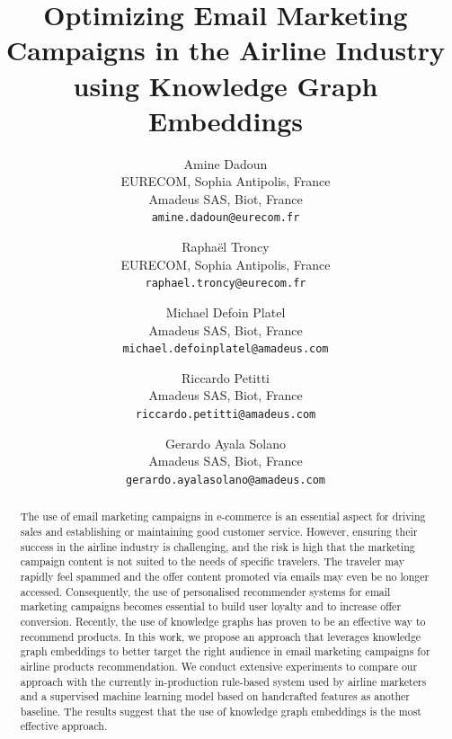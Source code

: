 \documentclass[11pt,dvipdfm]{article}
\begin{document}
\title{Optimizing Email Marketing Campaigns in the Airline Industry \\ using Knowledge Graph Embeddings}

\author{
  Amine Dadoun\\
  EURECOM, Sophia Antipolis, France\\
  Amadeus SAS, Biot, France\\
  \texttt{amine.dadoun@eurecom.fr}
  \and
  Rapha{\"{e}}l Troncy\\
  EURECOM, Sophia Antipolis, France\\
  \texttt{raphael.troncy@eurecom.fr}
  \and
  Michael Defoin Platel\\
  Amadeus SAS, Biot, France\\
  \texttt{michael.defoinplatel@amadeus.com}
  \and
  Riccardo Petitti\\
  Amadeus SAS, Biot, France\\
  \texttt{riccardo.petitti@amadeus.com}
  \and
  Gerardo Ayala Solano\\
  Amadeus SAS, Biot, France\\
  \texttt{gerardo.ayalasolano@amadeus.com}
}

\maketitle

\begin{abstract}
The use of email marketing campaigns in e-commerce is an essential aspect for driving sales and establishing or maintaining good customer service. However, ensuring their success in the airline industry is challenging, and the risk is high that the marketing campaign content is not suited to the needs of specific travelers. The traveler may rapidly feel spammed and the offer content promoted via emails may even be no longer accessed. Consequently, the use of personalised recommender systems for email marketing campaigns becomes essential to build user loyalty and to increase offer conversion. Recently, the use of knowledge graphs has proven to be an effective way to recommend products. In this work, we propose an approach that leverages knowledge graph embeddings to better target the right audience in email marketing campaigns for airline products recommendation. We conduct extensive experiments to compare our approach with the currently in-production rule-based system used by airline marketers and a supervised machine learning model based on handcrafted features as another baseline. The results suggest that the use of knowledge graph embeddings is the most effective approach.
\end{abstract}
\end{document}
